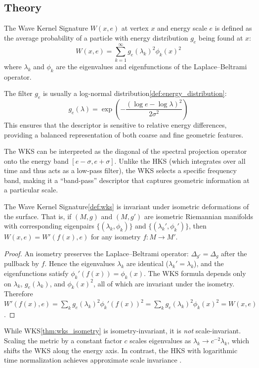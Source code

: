 \subsection{Theory}
The Wave Kernel Signature $W(x, e)$ at vertex $x$ and energy scale $e$ is defined as the average probability of a particle with energy distribution $g_e$ being found at $x$:
$$W(x, e) = \sum_{k=1}^\infty g_e(\lambda_k)^2 \phi_k(x)^2$$
where $\lambda_k$ and $\phi_k$ are the eigenvalues and eigenfunctions of the Laplace--Beltrami operator.

The filter $g_e$ is usually a log-normal distribution\cref{def:energy_distribution}:
$$g_e(\lambda) = \exp \left( -\frac{(\log e - \log \lambda)^2}{2\sigma^2} \right)$$
This ensures that the descriptor is sensitive to relative energy differences, providing a balanced representation of both coarse and fine geometric features.

The WKS can be interpreted as the diagonal of the spectral projection operator onto the energy band $[e - \sigma, e + \sigma]$. Unlike the HKS (which integrates over all time and thus acts as a low-pass filter), the WKS selects a specific frequency band, making it a ``band-pass'' descriptor that captures geometric information at a particular scale.

\begin{theorem}\label{thm:wks_isometry}
The Wave Kernel Signature\cref{def:wks} is invariant under isometric deformations of the surface. That is, if $(M, g)$ and $(M, g')$ are isometric Riemannian manifolds with corresponding eigenpairs $\{(\lambda_k, \phi_k)\}$ and $\{(\lambda_k', \phi_k')\}$, then $W(x, e) = W'(f(x), e)$ for any isometry $f: M \to M'$.
\end{theorem}
\begin{proof}
An isometry preserves the Laplace--Beltrami operator: $\Delta_{g'} = \Delta_g$ after the pullback by $f$. Hence the eigenvalues $\lambda_k$ are identical ($\lambda_k' = \lambda_k$), and the eigenfunctions satisfy $\phi_k'(f(x)) = \phi_k(x)$. The WKS formula depends only on $\lambda_k$, $g_e(\lambda_k)$, and $\phi_k(x)^2$, all of which are invariant under the isometry. Therefore $W'(f(x), e) = \sum_k g_e(\lambda_k)^2 \phi_k'(f(x))^2 = \sum_k g_e(\lambda_k)^2 \phi_k(x)^2 = W(x, e)$.
\end{proof}

\begin{observation}
While WKS\cref{thm:wks_isometry} is isometry-invariant, it is \emph{not} scale-invariant. Scaling the metric by a constant factor $c$ scales eigenvalues as $\lambda_k \to c^{-2} \lambda_k$, which shifts the WKS along the energy axis. In contrast, the HKS with logarithmic time normalization achieves approximate scale invariance \cite{bronstein2010}.
\end{observation}

